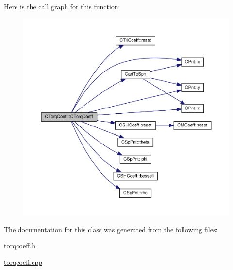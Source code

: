 Here is the call graph for this function\-:\nopagebreak
\begin{figure}[H]
\begin{center}
\leavevmode
\includegraphics[width=350pt]{classCTorqCoeff_a4c2700efbae3670b13ed1bcea4d990a8_cgraph}
\end{center}
\end{figure}




The documentation for this class was generated from the following files\-:\begin{DoxyCompactItemize}
\item 
\hyperlink{torqcoeff_8h}{torqcoeff.\-h}\item 
\hyperlink{torqcoeff_8cpp}{torqcoeff.\-cpp}\end{DoxyCompactItemize}
